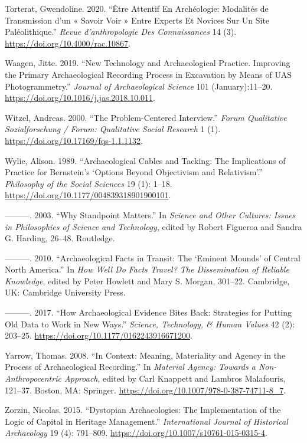 \documentclass[
]{article}
\newlength{\cslhangindent}
\newenvironment{CSLReferences}[2] %
 {\begin{list}{}{%
  \setlength{\itemindent}{0pt}
  \setlength{\leftmargin}{0pt}
  \setlength{\parsep}{0pt}
  \ifodd #1
   \setlength{\leftmargin}{\cslhangindent}
   \setlength{\itemindent}{-1\cslhangindent}
  \fi
  \setlength{\itemsep}{#2\baselineskip}}}
 {\end{list}}
\begin{document}
\begin{CSLReferences}{1}{0}
Torterat, Gwendoline. 2020. {``Être Attentif En Archéologie: {Modalités}
de Transmission d'un « Savoir Voir » Entre Experts Et Novices Sur Un
Site Paléolithique.''} \emph{Revue d'anthropologie Des Connaissances} 14
(3). \url{https://doi.org/10.4000/rac.10867}.

Waagen, Jitte. 2019. {``New Technology and Archaeological Practice.
{Improving} the Primary Archaeological Recording Process in Excavation
by Means of {UAS} Photogrammetry.''} \emph{Journal of Archaeological
Science} 101 (January):11--20.
\url{https://doi.org/10.1016/j.jas.2018.10.011}.

Witzel, Andreas. 2000. {``The Problem-Centered Interview.''} \emph{Forum
Qualitative Sozialforschung / Forum: Qualitative Social Research} 1 (1).
\url{https://doi.org/10.17169/fqs-1.1.1132}.

Wylie, Alison. 1989. {``Archaeological {Cables} and {Tacking}: {The
Implications} of {Practice} for {Bernstein}'s {`{Options Beyond
Objectivism} and {Relativism}'}.''} \emph{Philosophy of the Social
Sciences} 19 (1): 1--18.
\url{https://doi.org/10.1177/004839318901900101}.

---------. 2003. {``Why {Standpoint Matters}.''} In \emph{Science and
{Other Cultures}: {Issues} in {Philosophies} of {Science} and
{Technology}}, edited by Robert Figueroa and Sandra G. Harding, 26--48.
Routledge.

---------. 2010. {``Archaeological {Facts} in {Transit}: {The}
{`{Eminent Mounds}'} of {Central North America}.''} In \emph{How {Well
Do Facts Travel}? {The Dissemination} of {Reliable Knowledge}}, edited
by Peter Howlett and Mary S. Morgan, 301--22. Cambridge, UK: Cambridge
University Press.

---------. 2017. {``How {Archaeological Evidence Bites Back}:
{Strategies} for {Putting Old Data} to {Work} in {New Ways}.''}
\emph{Science, Technology, \& Human Values} 42 (2): 203--25.
\url{https://doi.org/10.1177/0162243916671200}.

Yarrow, Thomas. 2008. {``In {Context}: {Meaning}, {Materiality} and
{Agency} in the {Process} of {Archaeological Recording}.''} In
\emph{Material {Agency}: {Towards} a {Non-Anthropocentric Approach}},
edited by Carl Knappett and Lambros Malafouris, 121--37. Boston, MA:
Springer. \url{https://doi.org/10.1007/978-0-387-74711-8_7}.

Zorzin, Nicolas. 2015. {``Dystopian {Archaeologies}: {The
Implementation} of the {Logic} of {Capital} in {Heritage Management}.''}
\emph{International Journal of Historical Archaeology} 19 (4): 791--809.
\url{https://doi.org/10.1007/s10761-015-0315-4}.

\end{CSLReferences}
\end{document}
